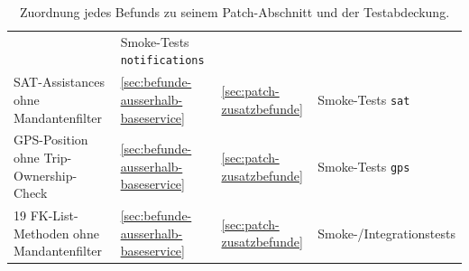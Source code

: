 \begin{table}[H]
\begin{center}
\begin{tabular}{|p{4.8cm}|l|l|p{3.8cm}|}
                   & Smoke-Tests \texttt{notifications}                                                              \\
                  SAT-Assistances ohne Mandantenfilter
                   & \ref{sec:befunde-ausserhalb-baseservice}
                   & \ref{sec:patch-zusatzbefunde}
                   & Smoke-Tests \texttt{sat}                                                                        \\
                  GPS-Position ohne Trip-Ownership-Check
                   & \ref{sec:befunde-ausserhalb-baseservice}
                   & \ref{sec:patch-zusatzbefunde}
                   & Smoke-Tests \texttt{gps}                                                                        \\
                  19 FK-List-Methoden ohne Mandantenfilter
                   & \ref{sec:befunde-ausserhalb-baseservice}
                   & \ref{sec:patch-zusatzbefunde}
                   & Smoke-/Integrationstests                                                                        \\
                  \hline
            \end{tabular}
      \end{center}
      \caption{Zuordnung jedes Befunds zu seinem Patch-Abschnitt und der Testabdeckung.}
      \label{tab:analyse_patch_test}
\end{table}
